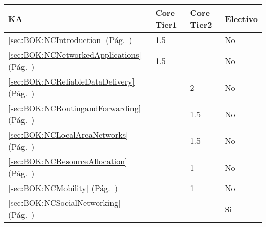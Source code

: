 \begin{center}
\begin{tabularx}{\textwidth}{|X|p{1cm}|p{1cm}|p{1.4cm}|}\hline
\textbf{\acf{KA}} & \textbf{Core Tier1} & \textbf{Core Tier2} & \textbf{Electivo} \\ \hline
\ref{sec:BOK:NCIntroduction} \htmlref{\NCIntroduction}{sec:BOK:NCIntroduction}\xspace (Pág.~\pageref{sec:BOK:NCIntroduction}) & 1.5 & ~ & No \\ \hline
\ref{sec:BOK:NCNetworkedApplications} \htmlref{\NCNetworkedApplications}{sec:BOK:NCNetworkedApplications}\xspace (Pág.~\pageref{sec:BOK:NCNetworkedApplications}) & 1.5 & ~ & No \\ \hline
\ref{sec:BOK:NCReliableDataDelivery} \htmlref{\NCReliableDataDelivery}{sec:BOK:NCReliableDataDelivery}\xspace (Pág.~\pageref{sec:BOK:NCReliableDataDelivery}) & ~ & 2 & No \\ \hline
\ref{sec:BOK:NCRoutingandForwarding} \htmlref{\NCRoutingandForwarding}{sec:BOK:NCRoutingandForwarding}\xspace (Pág.~\pageref{sec:BOK:NCRoutingandForwarding}) & ~ & 1.5 & No \\ \hline
\ref{sec:BOK:NCLocalAreaNetworks} \htmlref{\NCLocalAreaNetworks}{sec:BOK:NCLocalAreaNetworks}\xspace (Pág.~\pageref{sec:BOK:NCLocalAreaNetworks}) & ~ & 1.5 & No \\ \hline
\ref{sec:BOK:NCResourceAllocation} \htmlref{\NCResourceAllocation}{sec:BOK:NCResourceAllocation}\xspace (Pág.~\pageref{sec:BOK:NCResourceAllocation}) & ~ & 1 & No \\ \hline
\ref{sec:BOK:NCMobility} \htmlref{\NCMobility}{sec:BOK:NCMobility}\xspace (Pág.~\pageref{sec:BOK:NCMobility}) & ~ & 1 & No \\ \hline
\ref{sec:BOK:NCSocialNetworking} \htmlref{\NCSocialNetworking}{sec:BOK:NCSocialNetworking}\xspace (Pág.~\pageref{sec:BOK:NCSocialNetworking}) & ~ & ~ & Si \\ \hline
\end{tabularx}
\end{center}
